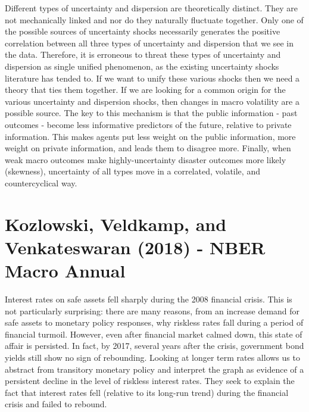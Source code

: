 \documentclass{article}
\begin{document}
{Different types of uncertainty and dispersion are theoretically distinct. They are not mechanically linked and nor do they naturally fluctuate together. Only one of the possible sources of uncertainty shocks necessarily generates the positive correlation between all three types of uncertainty and dispersion that we see in the data. Therefore, it is erroneous to threat these types of uncertainty and dispersion as single unified phenomenon, as the existing uncertainty shocks literature has tended to. If we want to unify these various shocks then we need a theory that ties them together. If we are looking for a common origin for the various uncertainty and dispersion shocks, then changes in macro volatility are a possible source. The key to this mechanism is that the public information - past outcomes - become less informative predictors of the future, relative to private information. This makes agents put less weight on the public information, more weight on private information, and leads them to disagree more.  Finally, when weak macro outcomes make highly-uncertainty disaster outcomes more likely (skewness), uncertainty of all types move in a correlated, volatile, and countercyclical way.

\section*{Kozlowski, Veldkamp, and Venkateswaran (2018) - NBER Macro Annual}

Interest rates on safe assets fell sharply during the 2008 financial crisis. This is not particularly surprising: there are many reasons, from an increase demand for safe assets to monetary policy responses, why riskless rates fall during a period of financial turmoil. However, even after financial market calmed down, this state of affair is persisted. In fact, by 2017, several years after the crisis, government bond yields still show no sign of rebounding. Looking at longer term rates allows us to abstract from transitory monetary policy and interpret the graph as evidence of a persistent decline in the level of riskless interest rates. They seek to explain the fact that interest rates fell (relative to its long-run trend) during the financial crisis and failed to rebound. 

}
\end{document}
